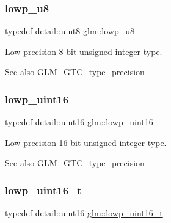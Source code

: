 \subsubsection{\texorpdfstring{lowp\+\_\+u8}{lowp\_u8}}
{\footnotesize\ttfamily typedef detail\+::uint8 \hyperlink{group__gtc__type__precision_gae63f942c49a30dbf266b2f13f3efe257}{glm\+::lowp\+\_\+u8}}

Low precision 8 bit unsigned integer type. \begin{DoxySeeAlso}{See also}
\hyperlink{group__gtc__type__precision}{G\+L\+M\+\_\+\+G\+T\+C\+\_\+type\+\_\+precision} 
\end{DoxySeeAlso}
\mbox{\label{group__gtc__type__precision_ga9b8409887319f62f06e664f6ca121b9d}} 
\subsubsection{\texorpdfstring{lowp\+\_\+uint16}{lowp\_uint16}}
{\footnotesize\ttfamily typedef detail\+::uint16 \hyperlink{group__gtc__type__precision_ga9b8409887319f62f06e664f6ca121b9d}{glm\+::lowp\+\_\+uint16}}

Low precision 16 bit unsigned integer type. \begin{DoxySeeAlso}{See also}
\hyperlink{group__gtc__type__precision}{G\+L\+M\+\_\+\+G\+T\+C\+\_\+type\+\_\+precision} 
\end{DoxySeeAlso}
\mbox{\label{group__gtc__type__precision_ga9a71176a4e5bc61951f9e9197d9c80e1}} 
\subsubsection{\texorpdfstring{lowp\+\_\+uint16\+\_\+t}{lowp\_uint16\_t}}
{\footnotesize\ttfamily typedef detail\+::uint16 \hyperlink{group__gtc__type__precision_ga9a71176a4e5bc61951f9e9197d9c80e1}{glm\+::lowp\+\_\+uint16\+\_\+t}}

